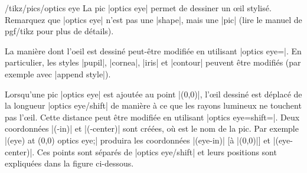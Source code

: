 \documentclass[a4paper]{ltxdoc}
\begin{document}
\begin{stylekey}{/tikz/pics/optics eye}
La pic |optics eye| permet de dessiner un œil stylisé. 
Remarquez que |optics eye| n'est pas une |shape|, mais une |pic| (lire le manuel de pgf/tikz pour plus de détails).

\begin{codeexample}[]
\end{codeexample}


La manière dont l'oeil est dessiné peut-être modifiée en utilisant |optics eye={}|.
En particulier, les styles |pupil|, |cornea|, |iris| et |contour| peuvent être modifiés (par exemple avec |append style|).

\begin{codeexample}[]
\end{codeexample}

Lorsqu'une pic |optics eye| est ajoutée au point |(0,0)|, l'œil dessiné est déplacé de la longueur |optics eye/shift| de manière à ce que les rayons lumineux ne touchent pas l'œil. Cette distance peut être modifiée en utilisant |optics eye={shift=}|.
Deux coordonnées |(-in)| et |(-center)| sont créées, où  est le nom de la pic. Par exemple |\pic (eye) at (0,0) {optics eye};| produira les coordonnées |(eye-in)| [à |(0,0)|] et |(eye-center)|. Ces points sont séparés de |optics eye/shift| et leurs positions sont expliquées dans la figure ci-dessous.


\end{stylekey}
\end{document}
